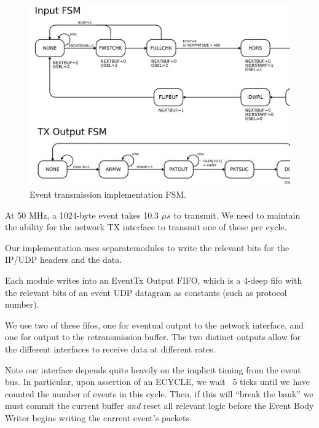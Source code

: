 \begin{figure}
\begin{centering}
\includegraphics[scale=0.8]{eventtx.fsm.svg}
\end{centering}
\caption{Event transmission implementation FSM.}
\label{eventtx.fsm}
\end{figure}

At 50 MHz, a 1024-byte event takes 10.3 $\mu s$ to transmit. We need to
maintain the ability for the network TX interface to transmit one of
these per cycle.

Our implementation uses separatemodules to write the relevant bits for
the IP/UDP headers and the data. 

Each module writes into an EventTx Output FIFO, which is a 4-deep fifo
with the relevant bits of an event UDP datagram as constants (such as
protocol number).

We use two of these fifos, one for eventual output to the network
interface, and one for output to the retransmission buffer. The two
distinct outputs allow for the different interfaces to receive data at
different rates.

Note our interface depends quite heavily on the implicit timing from
the event bus. In particular, upon assertion of an ECYCLE, we wait ~5
ticks until we have counted the number of events in this cycle. Then,
if this will ``break the bank'' we must commit the current buffer
\textit{and} reset all relevant logic before the Event Body Writer
begins writing the current event's packets.


